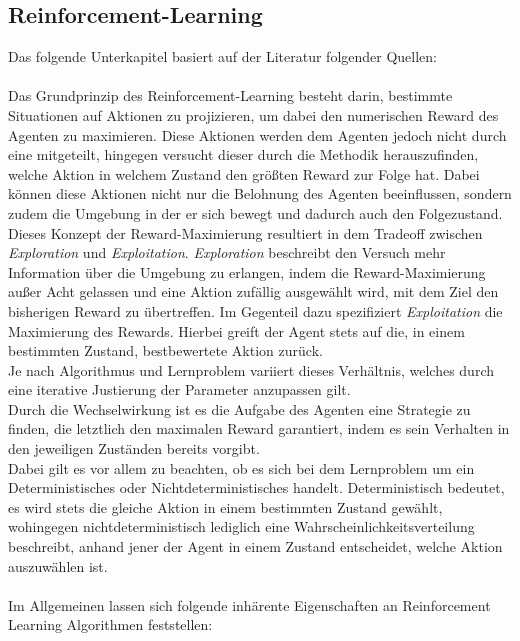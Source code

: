 \subsection{Reinforcement-Learning}
\label{subsec:rl}
Das folgende Unterkapitel basiert auf der Literatur folgender Quellen: \cite{MultiagentSystems,mlmitchel,Sutton}\\\\
Das Grundprinzip des Reinforcement-Learning besteht darin, bestimmte Situationen auf Aktionen zu projizieren, um dabei den numerischen Reward des Agenten zu maximieren. Diese Aktionen werden dem Agenten jedoch nicht durch eine  mitgeteilt, hingegen versucht dieser durch die  Methodik herauszufinden, welche Aktion in welchem Zustand  den größten Reward zur Folge hat. Dabei können diese Aktionen nicht nur die Belohnung des Agenten beeinflussen, sondern zudem die Umgebung in der er sich bewegt und dadurch auch den Folgezustand. \\
Dieses Konzept der Reward-Maximierung resultiert in dem Tradeoff zwischen \textit{Exploration} und \textit{Exploitation}. \textit{Exploration} beschreibt den Versuch mehr Information über die Umgebung zu erlangen, indem die Reward-Maximierung außer Acht gelassen und eine Aktion zufällig ausgewählt wird, mit dem Ziel den bisherigen Reward zu übertreffen. Im Gegenteil dazu spezifiziert \textit{Exploitation} die Maximierung des Rewards. Hierbei greift der Agent stets auf die, in einem bestimmten Zustand, bestbewertete Aktion zurück.\\
Je nach Algorithmus und Lernproblem variiert dieses Verhältnis, welches durch eine iterative Justierung der Parameter anzupassen gilt. \\
Durch die Wechselwirkung ist es die Aufgabe des Agenten eine Strategie zu finden, die letztlich den maximalen Reward garantiert, indem es sein Verhalten in den jeweiligen Zuständen bereits vorgibt. \\
Dabei gilt es vor allem zu beachten, ob es sich bei dem Lernproblem um ein Deterministisches oder Nichtdeterministisches handelt. Deterministisch bedeutet, es wird stets die gleiche Aktion in einem bestimmten Zustand gewählt, wohingegen nichtdeterministisch lediglich eine Wahrscheinlichkeitsverteilung beschreibt, anhand jener der Agent in einem Zustand entscheidet, welche Aktion auszuwählen ist.\\\\
Im Allgemeinen lassen sich folgende inhärente Eigenschaften an Reinforcement Learning Algorithmen feststellen:
